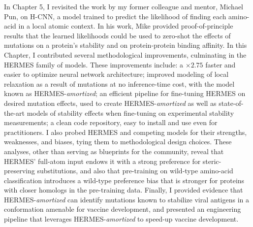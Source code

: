 In Chapter 5, I revisited the work by my former colleague and mentor, Michael Pun, on H-CNN, a model trained to predict the likelihood
of finding each amino-acid in a local atomic context. In his work, Mike provided proof-of-principle results that the learned likelihoods
could be used to zero-shot the effects of mutations on a protein's stability and on protein-protein binding affinity.
In this Chapter, I contributed several methodological improvements, culminating in the HERMES family of models.
These improvements include: a $\times 2.75$ faster and easier to optimize neural network architecture;
improved modeling of local relaxation as a result of mutations at no inference-time cost, with the model known as HERMES-\textit{amortized};
an efficient pipeline for fine-tuning HERMES on desired mutation effects, used to create HERMES-\textit{amortized}
as well as state-of-the-art models of stability effects when fine-tuning on experimental stability measurements;
a clean code repository, easy to install and use even for practitioners.
I also probed HERMES and competing models for their strengths, weaknesses,
and biases, tying them to methodological design choices. These analyses, other than serving as blueprints for the community, 
reveal that HERMES' full-atom input endows it with a strong preference for steric-preserving substitutions,
and also that pre-training on wild-type amino-acid classification introduces a wild-type preference bias that is stronger for proteins
with closer homologs in the pre-training data.
Finally, I provided evidence that HERMES-\textit{amortized} can identify mutations known to stabilize viral antigens in a conformation
amenable for vaccine development, and presented an engineering pipeline that leverages HERMES-\textit{amortized} to speed-up
vaccine development.

